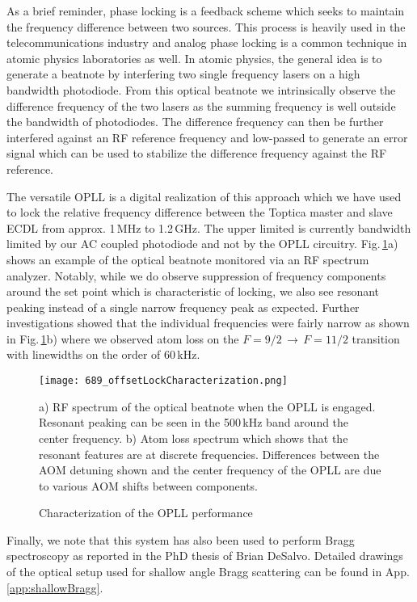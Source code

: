 As a brief reminder, phase locking is a feedback scheme which seeks to maintain the frequency difference between two sources.
This process is heavily used in the telecommunications industry and analog phase locking is a common technique in atomic physics laboratories as well.
In atomic physics, the general idea is to generate a beatnote by interfering two single frequency lasers on a high bandwidth photodiode.
From this optical beatnote we intrinsically observe the difference frequency of the two lasers as the summing frequency is well outside the bandwidth of photodiodes.
The difference frequency can then be further interfered against an RF reference frequency and low-passed to generate an error signal which can be used to stabilize the difference frequency against the RF reference.

The versatile OPLL is a digital realization of this approach which we have used to lock the relative frequency difference between the Toptica master and slave ECDL from approx. 1\,MHz to 1.2\,GHz.
The upper limited is currently bandwidth limited by our AC coupled photodiode and not by the OPLL circuitry.
Fig.\,\ref{fig:offsetDetails}a) shows an example of the optical beatnote monitored via an RF spectrum analyzer.
Notably, while we do observe suppression of frequency components around the set point which is characteristic of locking, we also see resonant peaking instead of a single narrow frequency peak as expected.
Further investigations showed that the individual frequencies were fairly narrow as shown in Fig.\,\ref{fig:offsetDetails}b) where we observed atom loss on the $F=9/2\,\rightarrow\,F=11/2$ transition with linewidths on the order of 60\,kHz.
	\begin{figure}
	\centerline{
		\texttt{[image: 689\_offsetLockCharacterization.png]}}
		\caption{Characterization of the OPLL performance}{a) RF spectrum of the optical beatnote when the OPLL is engaged. Resonant peaking can be seen in the 500\,kHz band around the center frequency. b) Atom loss spectrum which shows that the resonant features are at discrete frequencies. Differences between the AOM detuning shown and the center frequency of the OPLL are due to various AOM shifts between components.}
		 \label{fig:offsetDetails}
	\end{figure}

Finally, we note that this system has also been used to perform Bragg spectroscopy as reported in the PhD thesis of Brian DeSalvo.
Detailed drawings of the optical setup used for shallow angle Bragg scattering can be found in App.\,\ref{app:shallowBragg}.


